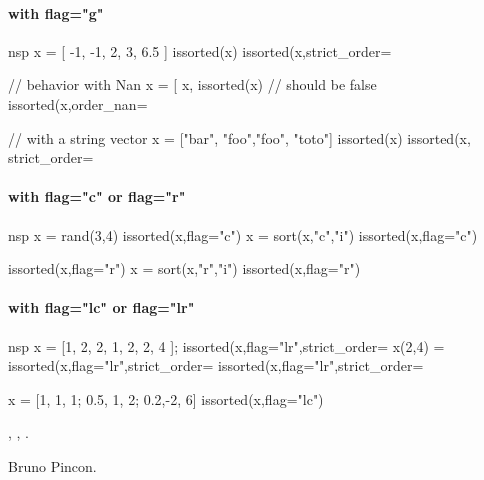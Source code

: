 \begin{examples}

\paragraph{with flag="g"}
\begin{mintednsp}{nsp}
x = [ -1, -1, 2, 3, 6.5 ]
issorted(x)
issorted(x,strict_order=%

// behavior with Nan
x = [ x, %
issorted(x)  // should be false
issorted(x,order_nan=%

// with a string vector
x = ["bar", "foo","foo", "toto"]
issorted(x)
issorted(x, strict_order=%
\end{mintednsp}

\paragraph{with flag="c" or  flag="r"}
\begin{mintednsp}{nsp}
x = rand(3,4)
issorted(x,flag="c")
x = sort(x,"c","i")
issorted(x,flag="c")

issorted(x,flag="r")
x = sort(x,"r","i")
issorted(x,flag="r")
\end{mintednsp}

\paragraph{with flag="lc" or  flag="lr"}
\begin{mintednsp}{nsp}
x = [1, 2, 2, %
     1, 2, 2, 4 ];
issorted(x,flag="lr",strict_order=%
x(2,4) = %
issorted(x,flag="lr",strict_order=%
issorted(x,flag="lr",strict_order=%

x = [1,   1, 1;
     0.5, 1, 2;
     0.2,-2, 6]
issorted(x,flag="lc")
\end{mintednsp}

\end{examples}

\begin{manseealso}
  , , .   
\end{manseealso}

\begin{authors}
Bruno Pincon.
\end{authors}
